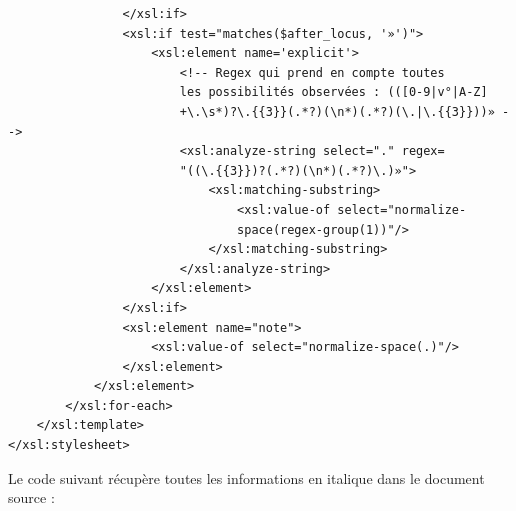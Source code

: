 \documentclass[a4paper,12pt,twoside]{book}
\begin{document}
\begin{verbatim}
                </xsl:if>
                <xsl:if test="matches($after_locus, '»')">
                    <xsl:element name='explicit'>
                        <!-- Regex qui prend en compte toutes 
                        les possibilités observées : (([0-9|v°|A-Z]
                        +\.\s*)?\.{{3}}(.*?)(\n*)(.*?)(\.|\.{{3}}))» -->
                        <xsl:analyze-string select="." regex=
                        "((\.{{3}})?(.*?)(\n*)(.*?)\.)»">
                            <xsl:matching-substring>
                                <xsl:value-of select="normalize-
                                space(regex-group(1))"/>
                            </xsl:matching-substring>
                        </xsl:analyze-string>
                    </xsl:element>
                </xsl:if>
                <xsl:element name="note">
                    <xsl:value-of select="normalize-space(.)"/>
                </xsl:element>
            </xsl:element>
        </xsl:for-each>
    </xsl:template>
</xsl:stylesheet>
	\end{verbatim}
	
	Le code suivant récupère toutes les informations en italique dans le document source : 
	
\end{document}
